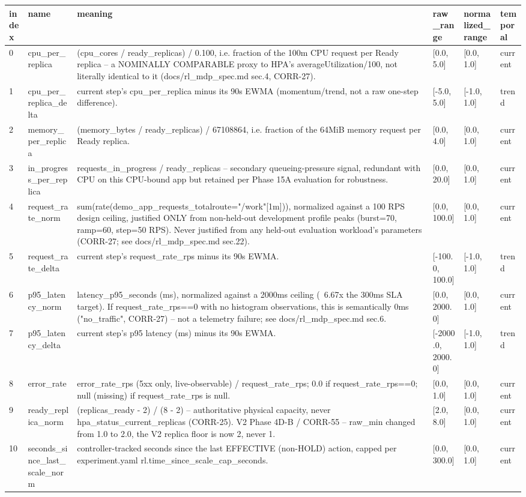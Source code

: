 \begin{tabular}{llllll}
\hline
index & name & meaning & raw\_range & normalized\_range & temporal \\
\hline
0 & cpu\_per\_replica & (cpu\_cores / ready\_replicas) / 0.100, i.e. fraction of the 100m CPU request per Ready replica -- a NOMINALLY COMPARABLE proxy to HPA's averageUtilization/100, not literally identical to it (docs/rl\_mdp\_spec.md sec.4, CORR-27). & [0.0, 5.0] & [0.0, 1.0] & current \\
1 & cpu\_per\_replica\_delta & current step's cpu\_per\_replica minus its 90s EWMA (momentum/trend, not a raw one-step difference). & [-5.0, 5.0] & [-1.0, 1.0] & trend \\
2 & memory\_per\_replica & (memory\_bytes / ready\_replicas) / 67108864, i.e. fraction of the 64MiB memory request per Ready replica. & [0.0, 4.0] & [0.0, 1.0] & current \\
3 & in\_progress\_per\_replica & requests\_in\_progress / ready\_replicas -- secondary queueing-pressure signal, redundant with CPU on this CPU-bound app but retained per Phase 15A evaluation for robustness. & [0.0, 20.0] & [0.0, 1.0] & current \\
4 & request\_rate\_norm & sum(rate(demo\_app\_requests\_total{route="/work"}[1m])), normalized against a 100 RPS design ceiling, justified ONLY from non-held-out development profile peaks (burst=70, ramp=60, step=50 RPS). Never justified from any held-out evaluation workload's parameters (CORR-27; see docs/rl\_mdp\_spec.md sec.22). & [0.0, 100.0] & [0.0, 1.0] & current \\
5 & request\_rate\_delta & current step's request\_rate\_rps minus its 90s EWMA. & [-100.0, 100.0] & [-1.0, 1.0] & trend \\
6 & p95\_latency\_norm & latency\_p95\_seconds (ms), normalized against a 2000ms ceiling (~6.67x the 300ms SLA target). If request\_rate\_rps==0 with no histogram observations, this is semantically 0ms ("no\_traffic", CORR-27) -- not a telemetry failure; see docs/rl\_mdp\_spec.md sec.6. & [0.0, 2000.0] & [0.0, 1.0] & current \\
7 & p95\_latency\_delta & current step's p95 latency (ms) minus its 90s EWMA. & [-2000.0, 2000.0] & [-1.0, 1.0] & trend \\
8 & error\_rate & error\_rate\_rps (5xx only, live-observable) / request\_rate\_rps; 0.0 if request\_rate\_rps==0; null (missing) if request\_rate\_rps is null. & [0.0, 1.0] & [0.0, 1.0] & current \\
9 & ready\_replica\_norm & (replicas\_ready - 2) / (8 - 2) -- authoritative physical capacity, never hpa\_status\_current\_replicas (CORR-25). V2 Phase 4D-B / CORR-55 -- raw\_min changed from 1.0 to 2.0, the V2 replica floor is now 2, never 1. & [2.0, 8.0] & [0.0, 1.0] & current \\
10 & seconds\_since\_last\_scale\_norm & controller-tracked seconds since the last EFFECTIVE (non-HOLD) action, capped per experiment.yaml rl.time\_since\_scale\_cap\_seconds. & [0.0, 300.0] & [0.0, 1.0] & current \\
\hline
\end{tabular}
